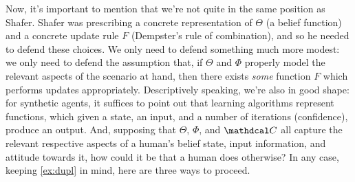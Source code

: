 \documentclass{uai2023}
\theoremstyle{plain}
\theoremstyle{definition}
\newcommand\confdom{\mathdcal C}
\begin{document}
Now, it's important to mention that we're not quite in the same position as Shafer.
Shafer was prescribing a concrete representation of $\Theta$ (a belief function) and a concrete update rule $F$ (Dempster's rule of combination), and so he needed to defend these choices.
We only need to defend something much more modest: we only need to defend the assumption that, if $\Theta$ and $\Phi$ properly model the relevant aspects of the scenario at hand, then there exists \emph{some} function $F$ which performs updates appropriately.
Descriptively speaking, we're also in good shape: for synthetic agents, it suffices to point out that learning algorithms represent functions, which given a state, an input, and a number of iterations (confidence), produce an output.
And, supposing that $\Theta$, $\Phi$, and $\confdom$ all capture the relevant respective aspects of a human's belief state, input information, and attitude towards it, how could it be that a human does otherwise?
In any case, keeping \cref{ex:dupl} in mind, here are three ways to proceed.
\end{document}
